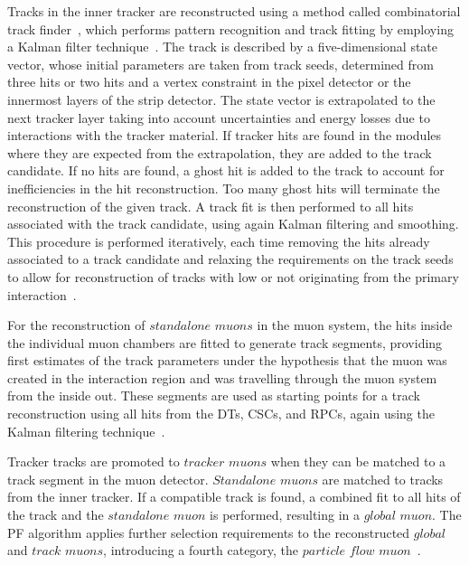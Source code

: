 Tracks in the inner tracker are reconstructed using a method called combinatorial track finder~\cite{Chatrchyan:2014fea}, which performs pattern recognition and track fitting by employing a Kalman filter technique~\cite{Fruhwirth1987444}. The track is described by a five-dimensional state vector, whose initial parameters are taken from track seeds, determined from three hits or two hits and a vertex constraint in the pixel detector or the innermost layers of the strip detector. The state vector is extrapolated to the next tracker layer taking into account uncertainties and energy losses due to interactions with the tracker material. If tracker hits are found in the modules where they are expected from the extrapolation, they are added to the track candidate. If no hits are found, a ghost hit is added to the track to account for inefficiencies in the hit reconstruction. Too many ghost hits will terminate the reconstruction of the given track. A track fit is then performed to all hits associated with the track candidate, using again Kalman filtering and smoothing. This procedure is performed iteratively, each time removing the hits already associated to a track candidate and relaxing the requirements on the track seeds to allow for reconstruction of tracks with low \pt or not originating from the primary interaction~\cite{SWGuideIterativeTracking}. 

For the reconstruction of $\textit{standalone muons}$ in the muon system, the hits inside the individual muon chambers are fitted to generate track segments, providing first estimates of the track parameters under the hypothesis that the muon was created in the interaction region and was travelling through the muon system from the inside out. These segments are used as starting points for a track reconstruction using all hits from the DTs, CSCs, and RPCs, again using the Kalman filtering technique~\cite{1748-0221-5-03-T03022}.

Tracker tracks are promoted to $\textit{tracker muons}$ when they can be matched to a track segment in the muon detector. $\textit{Standalone muons}$ are matched to tracks from the inner tracker. If a compatible track is found, a combined fit to all hits of the track and the $\textit{standalone muon}$ is performed, resulting in a $\textit{global muon}$. The PF algorithm applies further selection requirements to the reconstructed $\textit{global}$ and $\textit{track muons}$, introducing a fourth category, the $\textit{particle flow muon}$~\cite{CMS-PAS-PFT-10-003}. 

